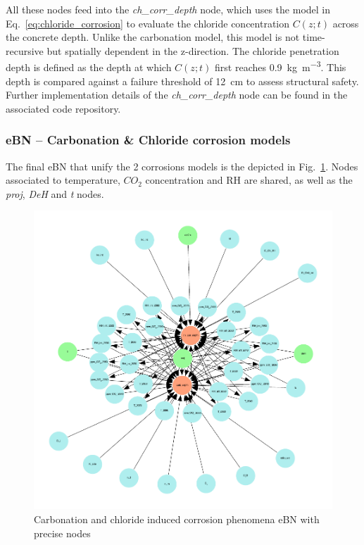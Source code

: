 All these nodes feed into the \textit{ch\_corr\_depth} node, which uses the model in Eq.~\ref{eq:chloride_corrosion} to evaluate the chloride concentration $C(z;t)$ across the concrete depth. Unlike the carbonation model, this model is not time-recursive but spatially dependent in the z-direction. The chloride penetration depth is defined as the depth at which $C(z;t)$ first reaches \SI{0.9}{\kilogram\per\cubic\meter}. This depth is compared against a failure threshold of \SI{12}{\centi\meter} to assess structural safety.
Further implementation details of the \textit{ch\_corr\_depth} node can be found in the associated code repository.

\subsubsection{eBN -- Carbonation \& Chloride corrosion models}
The final eBN that unify the 2 corrosions models is the depicted in Fig.~\ref{fig:precise_ebn}. Nodes associated to temperature, $CO_2$ concentration and RH are shared, as well as the \textit{proj}, \textit{DeH} and \textit{t} nodes. 

\begin{figure}[]
    \centering
    \includegraphics[width=\linewidth]{imgs/pdfs/12_total_ebn_precise.pdf}
    \caption{Carbonation and chloride induced corrosion phenomena eBN with precise nodes}\label{fig:precise_ebn}
\end{figure}

